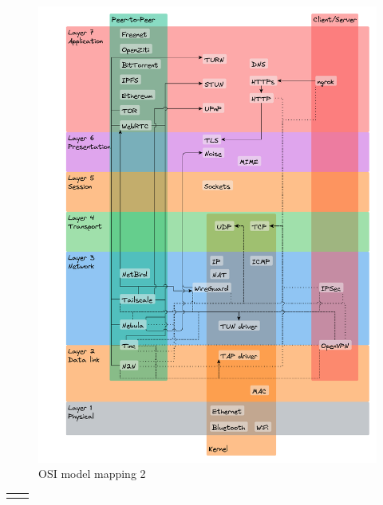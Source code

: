 \begin{figure}
\centering
\includegraphics[width=\textwidth,height=0.9\textheight]{notes/../figures/osi-map.yed.png}
\caption{OSI model mapping 2}
\end{figure}

\newpage

\begin{longtable}[]{@{}ll@{}}
\toprule\noalign{}
\endhead
\bottomrule\noalign{}
\endlastfoot
& \\
\end{longtable}


